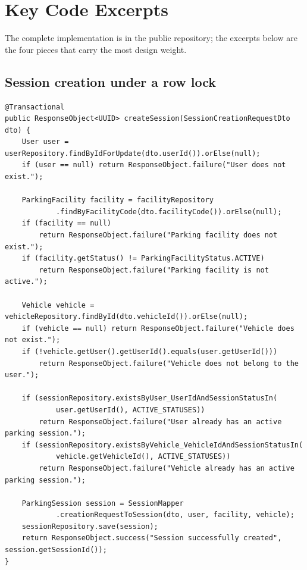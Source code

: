 \section{Key Code Excerpts}

The complete implementation is in the public repository; the excerpts below are the
four pieces that carry the most design weight.

\subsection{Session creation under a row lock}

\begin{lstlisting}[style=java,caption={The active-session check is read-then-write,
so the user row is locked for the transaction.},label={lst:create-session}]
@Transactional
public ResponseObject<UUID> createSession(SessionCreationRequestDto dto) {
    User user = userRepository.findByIdForUpdate(dto.userId()).orElse(null);
    if (user == null) return ResponseObject.failure("User does not exist.");

    ParkingFacility facility = facilityRepository
            .findByFacilityCode(dto.facilityCode()).orElse(null);
    if (facility == null)
        return ResponseObject.failure("Parking facility does not exist.");
    if (facility.getStatus() != ParkingFacilityStatus.ACTIVE)
        return ResponseObject.failure("Parking facility is not active.");

    Vehicle vehicle = vehicleRepository.findById(dto.vehicleId()).orElse(null);
    if (vehicle == null) return ResponseObject.failure("Vehicle does not exist.");
    if (!vehicle.getUser().getUserId().equals(user.getUserId()))
        return ResponseObject.failure("Vehicle does not belong to the user.");

    if (sessionRepository.existsByUser_UserIdAndSessionStatusIn(
            user.getUserId(), ACTIVE_STATUSES))
        return ResponseObject.failure("User already has an active parking session.");
    if (sessionRepository.existsByVehicle_VehicleIdAndSessionStatusIn(
            vehicle.getVehicleId(), ACTIVE_STATUSES))
        return ResponseObject.failure("Vehicle already has an active parking session.");

    ParkingSession session = SessionMapper
            .creationRequestToSession(dto, user, facility, vehicle);
    sessionRepository.save(session);
    return ResponseObject.success("Session successfully created", session.getSessionId());
}
\end{lstlisting}

